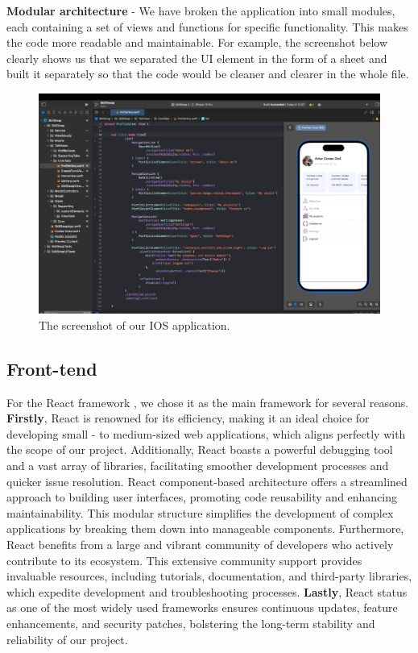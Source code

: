 \textbf{Modular architecture} - We have broken the application into small modules, each containing a set of views and functions for specific functionality. This makes the code more readable and maintainable.
For example, the screenshot below clearly shows us that we separated the UI element in the form of a sheet and built it separately so that the code would be cleaner and clearer in the whole file.

\begin{figure}[ht]\label{fig:screenios}
  \centering
  \includegraphics[width=0.8\linewidth]{figures/Screen IOS.png}
  \caption{The screenshot of our IOS application.}
\end{figure}

\subsection{Front-tend}\label{front}

\hspace*{0.5cm} For the React framework \cite{react}, we chose it as the main  \cite{htmlcssjs} framework for several reasons. \textbf{Firstly}, React \cite{react} is renowned for its efficiency, making it an ideal choice for developing small - to medium-sized web applications, which aligns perfectly with the scope of our project. Additionally, React \cite{react} boasts a powerful debugging tool and a vast array of libraries, facilitating smoother development processes and quicker issue resolution.
React \cite{react} component-based architecture offers a streamlined approach to building user interfaces, promoting code reusability and enhancing maintainability. This modular structure simplifies the development of complex applications by breaking them down into manageable components.
Furthermore, React \cite{react} benefits from a large and vibrant community of developers who actively contribute to its ecosystem. This extensive community support provides invaluable resources, including tutorials, documentation, and third-party libraries, which expedite development and troubleshooting processes. \textbf{Lastly}, React \cite{react} status as one of the most widely used  frameworks ensures continuous updates, feature enhancements, and security patches, bolstering the long-term stability and reliability of our project.

